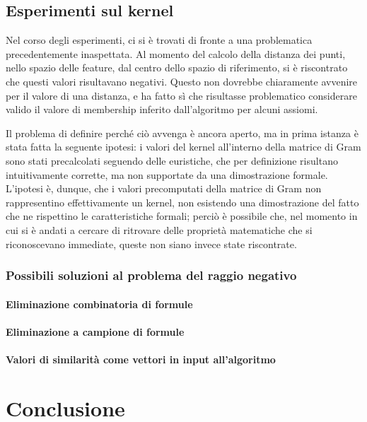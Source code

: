 \documentclass[12pt,a4paper]{report}
\begin{document}
\section{Esperimenti sul kernel}
Nel corso degli esperimenti, ci si è trovati di fronte a una problematica precedentemente inaspettata. 
Al momento del calcolo della distanza dei punti, nello spazio delle feature, dal centro dello spazio di riferimento, si è riscontrato che questi valori risultavano negativi. Questo non dovrebbe chiaramente avvenire per il valore di una distanza, e ha fatto sì che risultasse problematico considerare valido il valore di membership inferito dall'algoritmo per alcuni assiomi.

Il problema di definire perché ciò avvenga è ancora aperto, ma in prima istanza è stata fatta la seguente ipotesi: i valori del kernel all'interno della matrice di Gram sono stati precalcolati seguendo delle euristiche, che per definizione risultano intuitivamente corrette, ma non supportate da una dimostrazione formale. L'ipotesi è, dunque, che i valori precomputati della matrice di Gram non rappresentino effettivamente un kernel, non esistendo una dimostrazione del fatto che ne  rispettino le caratteristiche formali; perciò è possibile che, nel momento in cui si è andati a cercare di ritrovare delle proprietà matematiche che si riconoscevano immediate, queste non siano invece state riscontrate. 


\subsection{Possibili soluzioni al problema del raggio negativo}
\subsubsection{Eliminazione combinatoria di formule}
\subsubsection{Eliminazione a campione di formule}
\subsubsection{Valori di similarità come vettori in input all'algoritmo}

\chapter*{Conclusione}



\end{document}
